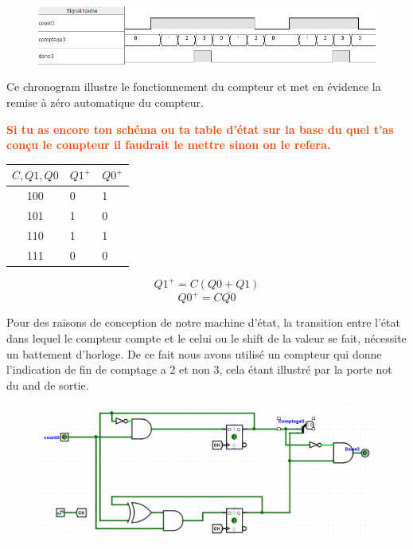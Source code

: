 \documentclass[a4paper]{article} %
\newcommand{\red}[1]{\textbf{\textcolor{OrangeRed}{#1}}}
\begin{document}
\begin{tcolorbox}[colframe=Monokaimagenta,colback=white, breakable, enhanced]
\begin{figure}[H]
	\centering
	\includegraphics[width=\textwidth]{src/chrono_CPT3_1}
	\label{fig:chrono_CPT_03_1}
\end{figure}
Ce chronogram illustre le fonctionnement du compteur et met en évidence la remise à zéro automatique du compteur.

\red{Si tu as encore ton schéma ou ta table d'état sur la base du quel t'as conçu le compteur il faudrait le mettre sinon on le refera.}\\
\begin{multicols}{2}
	\begin{tabular}{c|l l}
		$C,Q1,Q0$ & $Q1^+$& $Q0^+$ \\
		\hline
		100	&	0&1\\
		101	&	1&0\\
		110	&	1&1\\
		111	&	0&0\\
	\end{tabular}
	

	\begin{equation}
	Q1^+ = C(Q0 + Q1)
	\end{equation}
		\begin{equation}
			Q0^+ = C\overline{Q0}
		\end{equation}

\end{multicols}
Pour des raisons de conception de notre machine d'état, la transition entre l'état dans lequel le compteur compte et le celui ou le shift de la valeur se fait, nécessite un battement d'horloge. De ce fait nous avons utilisé un compteur qui donne l'indication de fin de comptage a 2 et non 3, cela étant illustré par la porte not du and de sortie.
\begin{figure}[H]
	\centering
	\includegraphics[width=\textwidth]{src/CPT_03_2}
	\label{fig:CPT_03_2}
\end{figure}
\end{tcolorbox}
\end{document}

